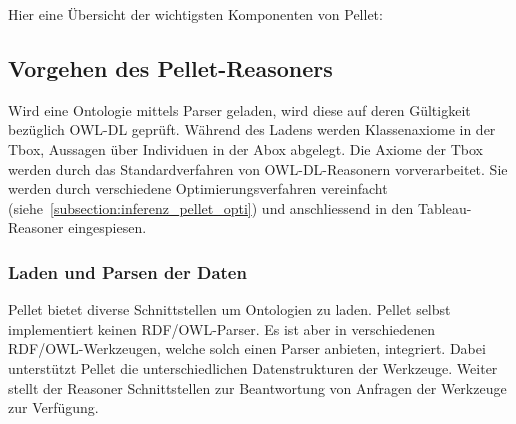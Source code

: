 Hier eine Übersicht der wichtigsten Komponenten von Pellet\cite[S. 4]{sirin:pellet05}:
\begin{table}[H]
\centering
{}\hfill
{}
\end{table}


\subsection{Vorgehen des Pellet-Reasoners}
\label{subsection:inferenz_pellet_vorgehen}
Wird eine Ontologie mittels Parser geladen, wird diese auf deren Gültigkeit bezüglich OWL-DL geprüft. Während des Ladens werden Klassenaxiome in der Tbox, Aussagen über Individuen in der Abox abgelegt. Die Axiome der Tbox werden durch das Standardverfahren von OWL-DL-Reasonern vorverarbeitet. Sie werden durch verschiedene Optimierungsverfahren vereinfacht (siehe~\ref{subsection:inferenz_pellet_opti}) und anschliessend in den Tableau-Reasoner eingespiesen.

\subsubsection{Laden und Parsen der Daten}
\label{ssubsection:inferenz_pellet_parsing}
Pellet bietet diverse Schnittstellen um Ontologien zu laden. Pellet selbst implementiert keinen RDF/OWL-Parser. Es ist aber in verschiedenen RDF/OWL-Werkzeugen, welche solch einen Parser anbieten, integriert. Dabei unterstützt Pellet die unterschiedlichen Datenstrukturen der Werkzeuge. Weiter stellt der Reasoner Schnittstellen zur Beantwortung von Anfragen der Werkzeuge zur Verfügung.

